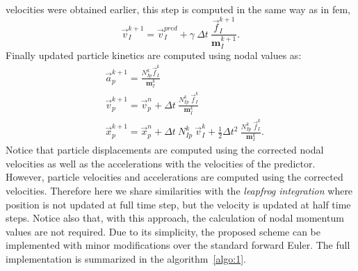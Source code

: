 \documentclass[preprint,12pt,a4paper]{elsarticle}
\newcommand{\tens}[1]{
  \ensuremath{\mathbf{{#1}}}
}
\begin{document}
velocities were obtained earlier, this step is computed in the same way as
in \acrshort{fem},
\begin{equation}
  \label{eq:Corrector-velocity}
  \vec{v}_{I}^{k+1} = \vec{v}_{I}^{pred} + \gamma\ \Delta t\ \frac{\vec{f}_{I}^{k+1}}{\tens{m}_I^{k+1}}.
\end{equation}
Finally updated particle kinetics are computed using nodal values as:
\begin{align}
  \label{eq:Update-lagrangian-pce}
        &\vec{a}_p^{k+1} = \frac{N_{Ip}^k\vec{f}_{I}^{k}}{\tens{m}_I^k}\\
      &\vec{v}_p^{k+1} = \vec{v}_p^n + \Delta t\
        \frac{N_{Ip}^k\
        \vec{f}_{I}^{k}}{\tens{m}_I^k}\\
      &\vec{x}_p^{k+1} = \vec{x}_p^n + \Delta t\
         N_{Ip}^k\ \vec{v}_{I}^{k} +
        \frac{1}{2}\Delta t^2\ \frac{N_{Ip}^k\
        \vec{f}_{I}^{k}}{\tens{m}_I^k}.
\end{align}
Notice that particle displacements are computed using the corrected
nodal velocities as well as the accelerations with the velocities
of the predictor. However, particle velocities and accelerations
are computed using the corrected velocities. Therefore here we share similarities
with the \textit{leapfrog integration} where position is not updated at
full time step, but the velocity is updated at half time steps. Notice
also that, with this approach, the calculation of nodal momentum values
are not required. Due to its simplicity, the proposed scheme can be implemented with minor modifications
over the standard forward Euler. The full implementation is summarized in the algorithm~\ref{algo:1}.
\end{document}
